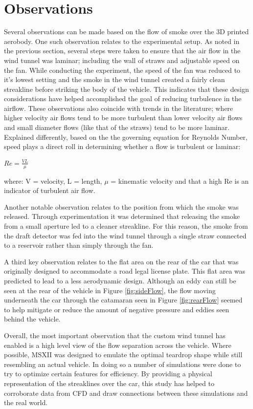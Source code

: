 \documentclass[12pt]{article}
\begin{document}
\section{Observations}
Several observations can be made based on the flow of smoke over the 3D printed aerobody. One such observation relates to the experimental setup. As noted in the previous section, several steps were taken to ensure that the air flow in the wind tunnel was laminar; including the wall of straws and adjustable speed on the fan. While conducting the experiment, the speed of the fan was reduced to it's lowest setting and the smoke in the wind tunnel created a fairly clean streakline before striking the body of the vehicle. This indicates that these design considerations have helped accomplished the goal of reducing turbulence in the airflow. These observations also coincide with trends in the literature; where higher velocity air flows tend to be more turbulent than lower velocity air flows and small diameter flows (like that of the straws) tend to be more laminar. Explained differently, based on the the governing equation for Reynolds Number, speed plays a direct roll in determining whether a flow is turbulent or laminar:

\begin{center}
$Re = \frac{VL}{\mu}$ 
\end{center}

where: V = velocity, L = length, $\mu$ = kinematic velocity and that a high Re is an indicator of turbulent air flow.

Another notable observation relates to the position from which the smoke was released. Through experimentation it was determined that releasing the smoke from a small aperture led to a cleaner streakline. For this reason, the smoke from the draft detector was fed into the wind tunnel through a single straw connected to a reservoir rather than simply through the fan. 

A third key observation relates to the flat area on the rear of the car that was originally designed to accommodate a road legal license plate. This flat area was predicted to lead to a less aerodynamic design. Although an eddy can still be seen at the rear of the vehicle in Figure \ref{fig:sideFlow}, the flow moving underneath the car through the catamaran seen in Figure \ref{fig:rearFlow} seemed to help mitigate or reduce the amount of negative pressure and eddies seen behind the vehicle.

Overall, the most important observation that the custom wind tunnel has enabled is a high level view of the flow separation across the vehicle. Where possible, MSXII was designed to emulate the optimal teardrop shape while still resembling an actual vehicle. In doing so a number of simulations were done to try to optimize certain features for efficiency. By providing a physical representation of the streaklines over the car, this study has helped to corroborate data from CFD and draw connections between these simulations and the real world.\\
\end{document}
